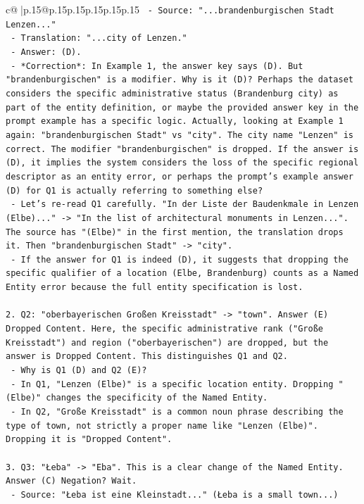 \documentclass{article}
\begin{document}
{\begin{supertabular}{c@{$\;$}|p{.15\linewidth}@{}p{.15\linewidth}p{.15\linewidth}p{.15\linewidth}p{.15\linewidth}p{.15\linewidth}}
{{{\texttt{   {-} Source: "...brandenburgischen Stadt Lenzen..."} \\
\texttt{   {-} Translation: "...city of Lenzen."} \\
\texttt{   {-} Answer: (D).} \\
\texttt{   {-} *Correction*: In Example 1, the answer key says (D). But "brandenburgischen" is a modifier. Why is it (D)? Perhaps the dataset considers the specific administrative status (Brandenburg city) as part of the entity definition, or maybe the provided answer key in the prompt example has a specific logic. Actually, looking at Example 1 again: "brandenburgischen Stadt" vs "city". The city name "Lenzen" is correct. The modifier "brandenburgischen" is dropped. If the answer is (D), it implies the system considers the loss of the specific regional descriptor as an entity error, or perhaps the prompt's example answer (D) for Q1 is actually referring to something else?} \\
\texttt{   {-} Let's re{-}read Q1 carefully. "In der Liste der Baudenkmale in Lenzen (Elbe)..." {-}> "In the list of architectural monuments in Lenzen...". The source has "(Elbe)" in the first mention, the translation drops it. Then "brandenburgischen Stadt" {-}> "city".} \\
\texttt{   {-} If the answer for Q1 is indeed (D), it suggests that dropping the specific qualifier of a location (Elbe, Brandenburg) counts as a Named Entity error because the full entity specification is lost.} \\
\\ 
\texttt{2. Q2: "oberbayerischen Großen Kreisstadt" {-}> "town". Answer (E) Dropped Content. Here, the specific administrative rank ("Große Kreisstadt") and region ("oberbayerischen") are dropped, but the answer is Dropped Content. This distinguishes Q1 and Q2.} \\
\texttt{   {-} Why is Q1 (D) and Q2 (E)?} \\
\texttt{   {-} In Q1, "Lenzen (Elbe)" is a specific location entity. Dropping "(Elbe)" changes the specificity of the Named Entity.} \\
\texttt{   {-} In Q2, "Große Kreisstadt" is a common noun phrase describing the type of town, not strictly a proper name like "Lenzen (Elbe)". Dropping it is "Dropped Content".} \\
\\ 
\texttt{3. Q3: "Łeba" {-}> "Eba". This is a clear change of the Named Entity. Answer (C) Negation? Wait.} \\
\texttt{   {-} Source: "Łeba ist eine Kleinstadt..." (Łeba is a small town...)} \\
}}}
\end{supertabular}}
\end{document}

